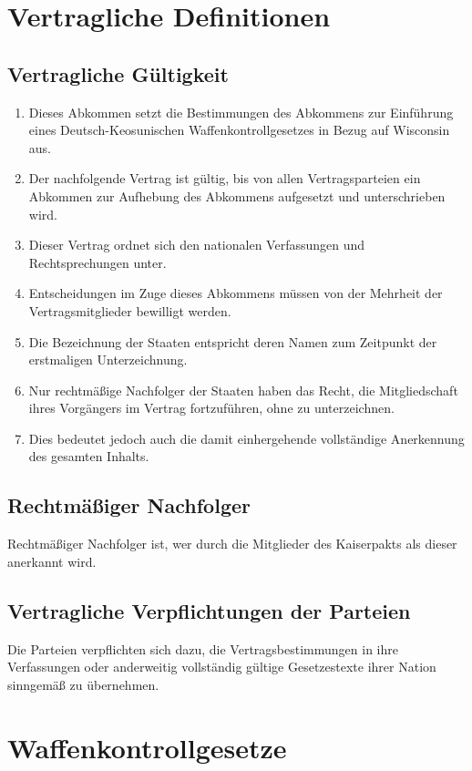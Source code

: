 \documentclass{article}
\begin{document}
\section{Vertragliche Definitionen}

\subsection{Vertragliche Gültigkeit}
\begin{enumerate}[(1)]
    \item Dieses Abkommen setzt die Bestimmungen des Abkommens zur Einführung eines Deutsch-Keosunischen Waffenkontrollgesetzes in Bezug auf Wisconsin aus.
    \item Der nachfolgende Vertrag ist gültig, bis von allen Vertragsparteien ein Abkommen zur Aufhebung des Abkommens aufgesetzt und unterschrieben wird.
    \item Dieser Vertrag ordnet sich den nationalen Verfassungen und Rechtsprechungen unter.
    \item Entscheidungen im Zuge dieses Abkommens müssen von der Mehrheit der Vertragsmitglieder bewilligt werden.
    \item Die Bezeichnung der Staaten entspricht deren Namen zum Zeitpunkt der erstmaligen Unterzeichnung.
    \item Nur rechtmäßige Nachfolger der Staaten haben das Recht, die Mitgliedschaft ihres Vorgängers im Vertrag fortzuführen, ohne zu unterzeichnen.
    \item Dies bedeutet jedoch auch die damit einhergehende vollständige Anerkennung des gesamten Inhalts.
\end{enumerate}

\subsection{Rechtmäßiger Nachfolger}
Rechtmäßiger Nachfolger ist, wer durch die Mitglieder des Kaiserpakts als dieser anerkannt wird.

\subsection{Vertragliche Verpflichtungen der Parteien}
Die Parteien verpflichten sich dazu, die Vertragsbestimmungen in ihre Verfassungen oder anderweitig vollständig gültige Gesetzestexte ihrer Nation sinngemäß zu übernehmen.

\section{Waffenkontrollgesetze}
\end{document}
